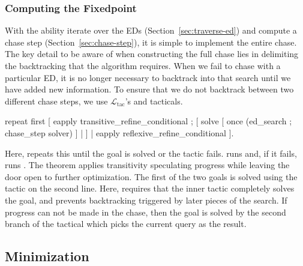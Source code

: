 \documentclass[preprint]{sigplanconf}
\newcommand{\ltac}[0]{\ensuremath{\mathcal{L}_{\mathrm{tac}}}}
\begin{document}
\subsubsection{Computing the Fixedpoint}
With the ability iterate over the EDs (Section~\ref{sec:traverse-ed}) and compute a chase step (Section~\ref{sec:chase-step}), it is simple to implement the entire chase.
The key detail to be aware of when constructing the full chase lies in delimiting the backtracking that the algorithm requires.
When we fail to chase with a particular ED, it is no longer necessary to backtrack into that search until we have added new information.
To ensure that we do not backtrack between two different chase steps, we use \ltac's  and  tacticals.
\begin{coq}
repeat first
   [ eapply transitive_refine_conditional ;
     [ solve [ once (ed_search ; chase_step solver) ]
     | ]
   | eapply reflexive_refine_conditional ].
\end{coq}
Here,  repeats this until the goal is solved or the tactic fails.
 runs  and, if it fails, runs .
The  theorem applies transitivity speculating progress while leaving the door open to further optimization.
The first of the two goals is solved using the tactic on the second line.
Here,  requires that the inner tactic completely solves the goal, and  prevents backtracking triggered by later pieces of the search.
If progress can not be made in the chase, then the goal is solved by the second branch of the  tactical which picks the current query as the result.


\subsection{Minimization}
\label{sec:minimization}
\end{document}
